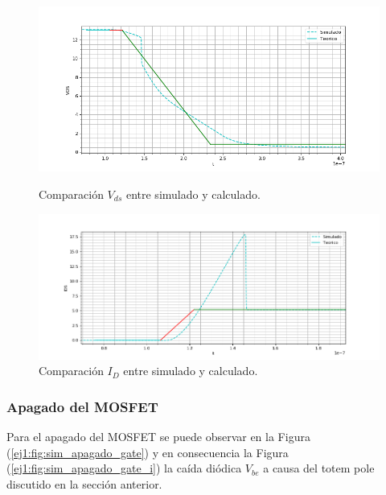 \begin{figure}[H]
	\centering
	\begin{minipage}{0.5\textwidth}
		\centering
		\includegraphics[width=1.1\textwidth]{ImagenesEjercicio-1/sim_encendido_drain} %
		\caption{Comparación $V_{ds}$ entre simulado y calculado.}
		\label{ej1:fig:sim_encendido_drain}
	\end{minipage}\hfill
	\begin{minipage}{0.5\textwidth}
		\centering
		\includegraphics[width=1.1\textwidth]{ImagenesEjercicio-1/sim_encendido_drain_i} %
		\caption{Comparación $I_{D}$ entre simulado y calculado.}
		\label{ej1:fig:sim_encendido_drain_i}
	\end{minipage}
\end{figure}



\subsubsection{Apagado del MOSFET}

Para el apagado del MOSFET se puede observar en la Figura (\ref{ej1:fig:sim_apagado_gate}) y en consecuencia la Figura (\ref{ej1:fig:sim_apagado_gate_i}) la caída diódica $V_{be}$ a causa del totem pole discutido en la sección anterior.

